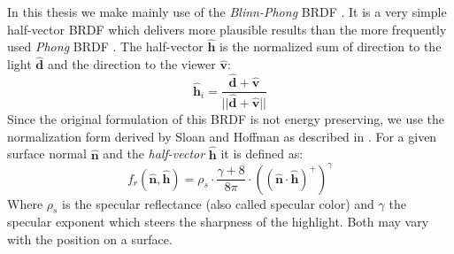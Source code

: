 \documentclass[thesis.tex]{subfiles}
\begin{document}
In this thesis we make mainly use of the \emph{Blinn-Phong} BRDF \cite{bib:blinnphongbrdf}.
It is a very simple half-vector BRDF which delivers more plausible results than the more frequently used \emph{Phong} BRDF \cite[p.~251f]{bib:RealtimeRenderingBook}.
The half-vector $\hat{\mathbf{h}}$ is the normalized sum of direction to the light $\hat{\mathbf{d}}$ and the direction to the viewer $\hat{\mathbf{v}}$:
\begin{equation}
\hat{\mathbf{h}}_i = \frac{\hat{\mathbf{d}} + \hat{\mathbf{v}}}{||\hat{\mathbf{d}} + \hat{\mathbf{v}}||}
\end{equation}
Since the original formulation of this BRDF is not energy preserving, we use the normalization form derived by Sloan and Hoffman as described in \cite[p.~257]{bib:RealtimeRenderingBook}.
For a given surface normal $\hat{\mathbf{n}}$ and the \emph{half-vector} $\hat{\mathbf{h}}$ it is defined as:
\begin{equation}
f_r(\hat{\mathbf{n}}, \hat{\mathbf{h}}) = \rho_s \cdot \frac{\gamma + 8}{8\pi} \cdot ((\hat{\mathbf{n}} \cdot \hat{\mathbf{h}})^+)^\gamma
\end{equation}
Where $\rho_s$ is the specular reflectance (also called specular color) and $\gamma$ the specular exponent which steers the sharpness of the highlight.
Both may vary with the position on a surface.
\end{document}
